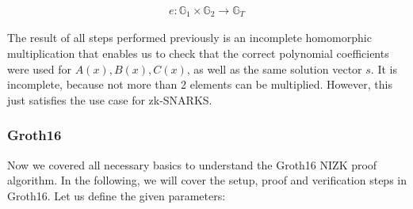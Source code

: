 \begin{align}
    e: \mathbb{G}_1 \times \mathbb{G}_2 \to \mathbb{G}_T
\end{align}

The result of all steps performed previously is an incomplete homomorphic multiplication that enables us to check that the correct polynomial coefficients were used for \(A(x), B(x), C(x)\), as well as the same solution vector \(s\). It is incomplete, because not more than 2 elements can be multiplied. However, this just satisfies the use case for zk-SNARKS. 

\subsubsection{Groth16}

Now we covered all necessary basics to understand the Groth16 NIZK proof algorithm. In the following, we will cover the setup, proof and verification steps in Groth16.
Let us define the given parameters:
\setlength{\tabcolsep}{2ex}
\renewcommand{\arraystretch}{1.5}%

